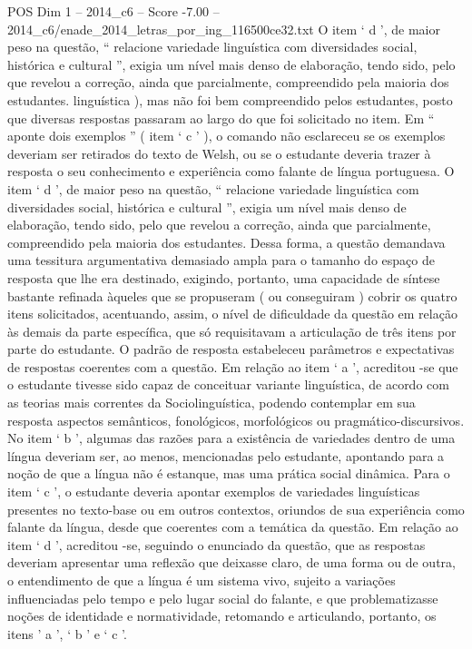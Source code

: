 \begin{textsample}{POS Dim 1 – 2014\_c6 – Score -7.00 – 2014\_c6/enade\_2014\_letras\_por\_ing\_116500ce32.txt}
O item ‘ d ’, de maior peso na questão, “ relacione variedade linguística com diversidades social, histórica e cultural ”, exigia um nível mais denso de elaboração, tendo sido, pelo que revelou a correção, ainda que parcialmente, compreendido pela maioria dos estudantes. linguística ), mas não foi bem compreendido pelos estudantes, posto que diversas respostas passaram ao largo do que foi solicitado no item.
Em “ aponte dois exemplos ” ( item ‘ c ’ ), o comando não esclareceu se os exemplos deveriam ser retirados do texto de Welsh, ou se o estudante deveria trazer à resposta o seu conhecimento e experiência como falante de língua portuguesa.
O item ‘ d ’, de maior peso na questão, “ relacione variedade linguística com diversidades social, histórica e cultural ”, exigia um nível mais denso de elaboração, tendo sido, pelo que revelou a correção, ainda que parcialmente, compreendido pela maioria dos estudantes.
Dessa forma, a questão demandava uma tessitura argumentativa demasiado ampla para o tamanho do espaço de resposta que lhe era destinado, exigindo, portanto, uma capacidade de síntese bastante refinada àqueles que se propuseram ( ou conseguiram ) cobrir os quatro itens solicitados, acentuando, assim, o nível de dificuldade da questão em relação às demais da parte específica, que só requisitavam a articulação de três itens por parte do estudante.
O padrão de resposta estabeleceu parâmetros e expectativas de respostas coerentes com a questão.
Em relação ao item ‘ a ’, acreditou -se que o estudante tivesse sido capaz de conceituar variante linguística, de acordo com as teorias mais correntes da Sociolinguística, podendo contemplar em sua resposta aspectos semânticos, fonológicos, morfológicos ou pragmático-discursivos.
No item ‘ b ’, algumas das razões para a existência de variedades dentro de uma língua deveriam ser, ao menos, mencionadas pelo estudante, apontando para a noção de que a língua não é estanque, mas uma prática social dinâmica.
Para o item ‘ c ’, o estudante deveria apontar exemplos de variedades linguísticas presentes no texto-base ou em outros contextos, oriundos de sua experiência como falante da língua, desde que coerentes com a temática da questão.
Em relação ao item ‘ d ’, acreditou -se, seguindo o enunciado da questão, que as respostas deveriam apresentar uma reflexão que deixasse claro, de uma forma ou de outra, o entendimento de que a língua é um sistema vivo, sujeito a variações influenciadas pelo tempo e pelo lugar social do falante, e que problematizasse noções de identidade e normatividade, retomando e articulando, portanto, os itens ’ a ’, ‘ b ’ e ‘ c ’.

\end{textsample}

